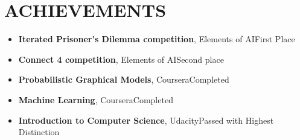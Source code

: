 \documentclass{article}
\begin{document}
\section*{ACHIEVEMENTS}
\begin{itemize}
    \item \textbf{Iterated Prisoner's Dilemma competition}, Elements of AI\hfill First Place
    \item \textbf{Connect 4 competition}, Elements of AI\hfill Second place
	\item \textbf{Probabilistic Graphical Models}, Coursera\hfill Completed
	\item \textbf{Machine Learning}, Coursera\hfill Completed
	\item \textbf{Introduction to Computer Science}, Udacity\hfill Passed with Highest Distinction
\end{itemize}
\end{document}
